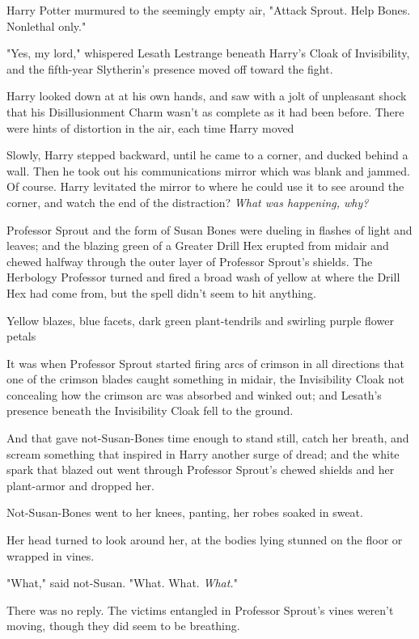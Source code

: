 Harry Potter murmured to the seemingly empty air, "Attack Sprout. Help Bones.
Nonlethal only."

"Yes, my lord," whispered Lesath Lestrange beneath Harry's Cloak of
Invisibility, and the fifth-year Slytherin's presence moved off toward the
fight.

Harry looked down at at his own hands, and saw with a jolt of unpleasant shock
that his Disillusionment Charm wasn't as complete as it had been before. There
were hints of distortion in the air, each time Harry moved{\el}

Slowly, Harry stepped backward, until he came to a corner, and ducked behind a
wall. Then he took out his communications mirror{\el} which was blank and
jammed. Of course. Harry levitated the mirror to where he could use it to see
around the corner, and watch the end of the{\el} distraction? \emph{What was
happening, why?}

Professor Sprout and the form of Susan Bones were dueling in flashes of light
and leaves; and the blazing green of a Greater Drill Hex erupted from midair
and chewed halfway through the outer layer of Professor Sprout's shields. The
Herbology Professor turned and fired a broad wash of yellow at where the Drill
Hex had come from, but the spell didn't seem to hit anything.

Yellow blazes, blue facets, dark green plant-tendrils and swirling purple
flower petals{\el}

It was when Professor Sprout started firing arcs of crimson in all directions
that one of the crimson blades caught something in midair, the Invisibility
Cloak not concealing how the crimson arc was absorbed and winked out; and
Lesath's presence beneath the Invisibility Cloak fell to the ground.

And that gave not-Susan-Bones time enough to stand still, catch her breath, and
scream something that inspired in Harry another surge of dread; and the white
spark that blazed out went through Professor Sprout's chewed shields and her
plant-armor and dropped her.

Not-Susan-Bones went to her knees, panting, her robes soaked in sweat.

Her head turned to look around her, at the bodies lying stunned on the floor or
wrapped in vines.

"What," said not-Susan. "What. What. \emph{What.}"

There was no reply. The victims entangled in Professor Sprout's vines weren't
moving, though they did seem to be breathing.

